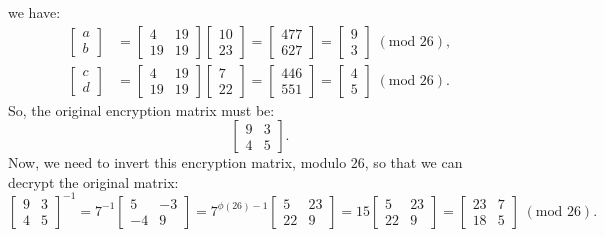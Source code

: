 \documentclass{article}
\begin{document}
we have:
\begin{align*}
    \begin{bmatrix}
        a \\
        b
    \end{bmatrix} &= \begin{bmatrix}
        4 & 19 \\
        19 & 19
    \end{bmatrix} \begin{bmatrix}
        10 \\
        23
    \end{bmatrix} = \begin{bmatrix}
        477 \\
        627
    \end{bmatrix} = \begin{bmatrix}
        9 \\
        3
    \end{bmatrix} \; (\text{mod } 26), \\
    \begin{bmatrix}
        c \\
        d
    \end{bmatrix} &= \begin{bmatrix}
        4 & 19 \\
        19 & 19
    \end{bmatrix} \begin{bmatrix}
        7 \\
        22
    \end{bmatrix} = \begin{bmatrix}
        446 \\
        551
    \end{bmatrix} = \begin{bmatrix}
        4 \\
        5
    \end{bmatrix} \; (\text{mod } 26).
\end{align*}
So, the original encryption matrix must be:
\[
    \begin{bmatrix}
        9 & 3 \\
        4 & 5
    \end{bmatrix}.
\]
Now, we need to invert this encryption matrix, modulo $26$, so that we can decrypt the original matrix:
\[
    \begin{bmatrix}
        9 & 3 \\
        4 & 5
    \end{bmatrix}^{-1} = 7^{-1} \begin{bmatrix}
        5 & -3 \\
        -4 & 9
    \end{bmatrix} = 7^{\phi(26) - 1} \begin{bmatrix}
        5 & 23 \\
        22 & 9
    \end{bmatrix} = 15 \begin{bmatrix}
        5 & 23 \\
        22 & 9
    \end{bmatrix} = \begin{bmatrix}
        23 & 7 \\
        18 & 5
    \end{bmatrix} \; (\text{mod } 26).
\]
\end{document}
